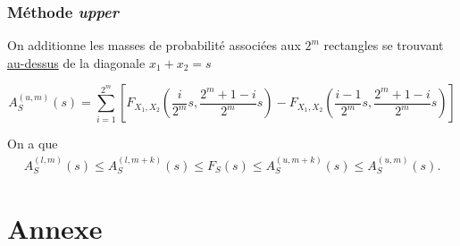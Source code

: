 \documentclass[10pt, french]{article}
\begin{document}
\begin{multicols*}{2}
\subsubsection{Méthode \textit{upper}}
On additionne les masses de probabilité associées aux $2^m$ rectangles se trouvant \underline{au-dessus} de la diagonale $x_1 + x_2 = s$

\begin{equation}
\label{eq:rectangle-upper}
A_{S}^{(u, m)}(s) = \sum_{i=1}^{2^m} \left [ F_{X_1, X_2} \left( \frac{i}{2^m} s, \frac{2^m +1- i}{2^m} s \right) -  F_{X_1, X_2} \left( \frac{i-1}{2^m} s, \frac{2^m +1 - i}{2^m} s \right) \right ]
\end{equation}

On a que
\begin{align*}
A_S^{(l, m)}(s)  \leq A_S^{(l, m+k)}(s) \leq F_S(s)  \leq A_S^{(u, m+k)}(s) \leq A_S^{(u, m)}(s).
\end{align*}










\newpage
\section{Annexe}


\end{multicols*}




\end{document}
